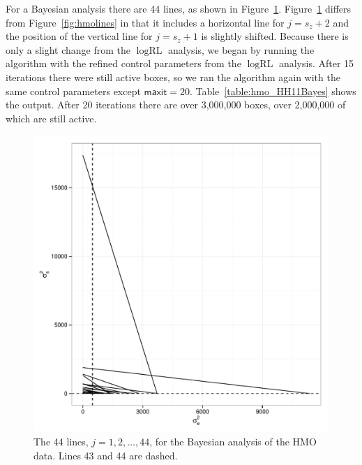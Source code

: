 \documentclass{report}
\newcommand{\textcompute}{\textsf}
\newcommand{\RLorig}{\text{RL}}
\newcommand{\logRLorig}{\log\RLorig}
\newcommand{\maxit}{\textcompute{maxit}}
\begin{document}
For a Bayesian analysis there are 44 lines, as shown in Figure~\ref{fig:hmoBayeslines}.  Figure~\ref{fig:hmoBayeslines} differs from Figure~\ref{fig:hmolines} in that it includes a horizontal line for $j = s_z+2$ and the position of the vertical line for $j = s_z+1$ is slightly shifted.  Because there is only a slight change from the $\logRLorig$ analysis, we began by running the algorithm with the refined control parameters from the $\logRLorig$ analysis.  After 15 iterations there were still active boxes, so we ran the algorithm again with the same control parameters except $\maxit=20$.  Table~\ref{table:hmo_HH11Bayes} shows the output.  After 20 iterations there are over 3,000,000 boxes, over 2,000,000 of which are still active.
\begin{figure}
	\centering
	\includegraphics[width=.45\linewidth]{figs/hmolines_HH11_Bayes.pdf}
	\caption{The 44 lines, $j=1, 2, \dots, 44$, for the Bayesian analysis of the HMO data.
	              Lines 43 and 44 are dashed.}
	\label{fig:hmoBayeslines}
\end{figure}
\end{document}
